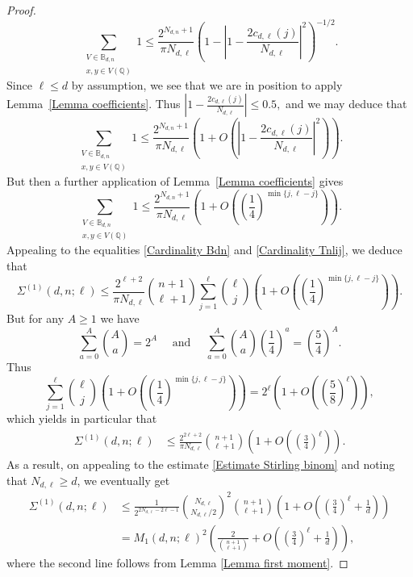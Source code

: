 \documentclass[11pt, reqno]{amsart}
\numberwithin{equation}{section}
\renewcommand{\leq}{\leqslant}
\renewcommand{\geq}{\geqslant}
\begin{document}
\begin{proof}
\begin{equation*}
\sum_{\substack{V \in \mathbb{B}_{d,n} \\ x, y \in V(\mathbb{Q})}} 1 \leq \frac{2^{N_{d,n}+1}}{\pi N_{d,\ell} } \left( 1-\left|
 1-\frac{2c_{d,\ell}(j)}{N_{d,\ell}}\right|^2\right)^{-1/2}.
\end{equation*}
Since  $\ell \leq d$ by assumption, we 
 see that we are in position to apply Lemma~\ref{Lemma coefficients}. 
Thus 
 $
 \left|
 1-\frac{2c_{d,\ell}(j)}{N_{d,\ell}}\right|\leq 0.5,
 $
and we may deduce that
 \begin{equation*}
\sum_{\substack{V \in \mathbb{B}_{d,n} \\ x, y \in V(\mathbb{Q})}} 1 \leq \frac{2^{N_{d,n}+1}}{\pi N_{d,\ell} } \left( 1+O\left(\left|
 1-\frac{2c_{d,\ell}(j)}{N_{d,\ell}}\right|^2\right)\right).
\end{equation*}
 But then a further  
application of   Lemma~\ref{Lemma coefficients} gives
\begin{equation*}
\sum_{\substack{V \in \mathbb{B}_{d,n} \\ x, y \in V(\mathbb{Q})}} 1 \leq \frac{2^{N_{d,n}+1}}{\pi N_{d,\ell}} \left( 1 + O \left( \left(\frac{1}{4} \right)^{\min \{ j, \ell-j \}} \right) \right).
\end{equation*}
Appealing to the equalities \eqref{Cardinality Bdn} and \eqref{Cardinality Tnlij}, we deduce that
\begin{equation*}
\Sigma^{(1)}(d,n;\ell) \leq \frac{2^{\ell+2}}{\pi N_{d,\ell}} \binom{n+1}{\ell+1} \sum_{j=1}^{\ell} \binom{\ell}{j} \left( 1 + O \left( \left(\frac{1}{4} \right)^{\min \{ j, \ell-j \}} \right) \right).
\end{equation*}
But for any $A\geq 1$ we have 
$$
\sum_{a=0}^A \binom{A}{a}=2^A \quad \text{ and } \quad 
\sum_{a=0}^A \binom{A}{a}\left(\frac{1}{4}\right)^a=\left(\frac{5}{4}\right)^A.
$$
Thus 
\begin{equation*}
\sum_{j=1}^{\ell} \binom{\ell}{j} \left( 1 + O \left( \left(\frac{1}{4} \right)^{\min \{ j, \ell-j \}} \right) \right)=
2^\ell \left(1+ O\left(\left(\frac{5}{8}\right)^\ell\right)\right),
\end{equation*}
which yields  in particular that
\begin{align*}
\Sigma^{(1)}(d,n;\ell) & \leq  \frac{2^{2\ell+2}}{\pi N_{d,\ell}} \binom{n+1}{\ell+1} \left( 1 + O\left(
\left(\frac{3}{4}\right)^\ell\right) \right).
\end{align*}
As a result, on appealing to the estimate \eqref{Estimate Stirling binom} and noting that $N_{d,\ell} \geq  d$, we eventually get
\begin{equation}
\label{Upper bound Sigma1}
\begin{split}
\Sigma^{(1)}(d,n;\ell) 
&\leq \frac1{2^{2N_{d,\ell}-2\ell-1}} \binom{N_{d,\ell}}{N_{d,\ell}/2}^2 \binom{n+1}{\ell+1} \left( 1 + O \left( \left(\frac{3}{4}\right)^\ell+\frac{1}{d}\right) \right)\\
&= M_1(d,n;\ell)^2 
\left( \frac{2}{\binom{n+1}{\ell+1}} + O \left( \left(\frac{3}{4}\right)^\ell+\frac{1}{d}\right) \right),
\end{split}
\end{equation}
where the second line follows from Lemma \ref{Lemma first moment}.


\end{proof}
\end{document}

